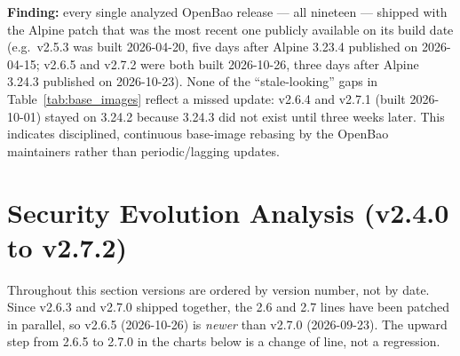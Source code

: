 \documentclass{article}
\begin{document}
\noindent\textbf{Finding:} every single analyzed OpenBao release --- all nineteen --- shipped with the Alpine patch that was the most recent one publicly available on its build date (e.g.\ v2.5.3 was built 2026-04-20, five days after Alpine 3.23.4 published on 2026-04-15; v2.6.5 and v2.7.2 were both built 2026-10-26, three days after Alpine 3.24.3 published on 2026-10-23). None of the ``stale-looking'' gaps in Table~\ref{tab:base_images} reflect a missed update: v2.6.4 and v2.7.1 (built 2026-10-01) stayed on 3.24.2 because 3.24.3 did not exist until three weeks later. This indicates disciplined, continuous base-image rebasing by the OpenBao maintainers rather than periodic/lagging updates.

\section{Security Evolution Analysis (v2.4.0 to v2.7.2)}

Throughout this section versions are ordered by version number, not by date. Since v2.6.3 and v2.7.0 shipped together, the 2.6 and 2.7 lines have been patched in parallel, so v2.6.5 (2026-10-26) is \emph{newer} than v2.7.0 (2026-09-23). The upward step from 2.6.5 to 2.7.0 in the charts below is a change of line, not a regression.
\end{document}
